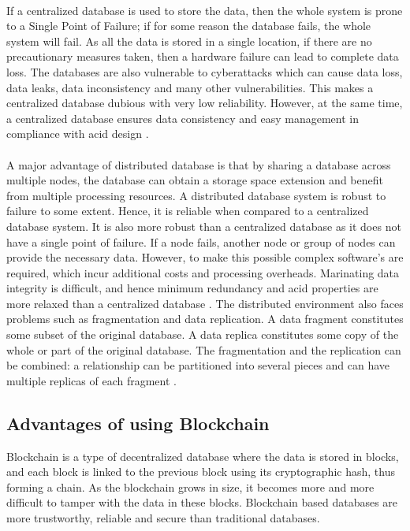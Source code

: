 \documentclass[12pt]{article}
\begin{document}
        \paragraph{}
        If a centralized database is used to store the data, then the whole system is prone to a Single Point of Failure; if for some reason the database fails, the whole system will fail. As all the data is stored in a single location, if there are no precautionary measures taken, then a hardware failure can lead to complete data loss. The databases are also vulnerable to cyberattacks which can cause data loss, data leaks, data inconsistency and many other vulnerabilities. This makes a centralized database dubious with very low reliability. However, at the same time, a centralized database ensures data consistency and easy management in compliance with \acrshort{acid} design \cite{centralizeddistributeddatabases}.
        
        \paragraph{}
        A major advantage of distributed database is that by sharing a database across multiple nodes, the database can obtain a storage space extension and benefit from multiple processing resources. A distributed database system is robust to failure to some extent. Hence, it is reliable when compared to a  centralized database system. It is also more robust than a centralized database as it does not have a single point of failure. If a node fails, another node or group of nodes can provide the necessary data. However, to make this possible complex software's are required, which incur additional costs and processing overheads. Marinating data integrity is difficult, and hence minimum redundancy and \acrshort{acid} properties are more relaxed than a centralized database \cite{centralizeddistributeddatabases}. The distributed environment also faces problems such as fragmentation and data replication. A data fragment constitutes some subset of the original database. A data replica constitutes some copy of the whole or part of the original database. The fragmentation and the replication can be combined: a relationship can be partitioned into several pieces and can have multiple replicas of each fragment \cite{distributedsystems}.
        
    \subsection{Advantages of using Blockchain}
        Blockchain is a type of decentralized database where the data is stored in blocks, and each block is linked to the previous block using its cryptographic hash, thus forming a chain. As the blockchain grows in size, it becomes more and more difficult to tamper with the data in these blocks. Blockchain based databases are more trustworthy, reliable and secure than traditional databases.
\end{document}
